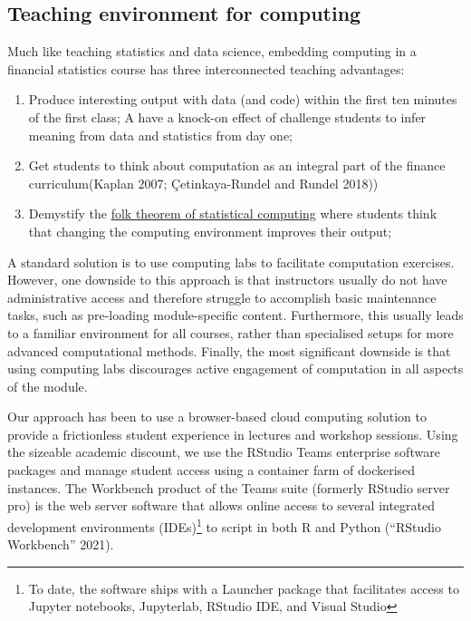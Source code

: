 \documentclass{article}
\begin{document}
\hypertarget{teaching-environment-for-computing}{%
\subsection{Teaching environment for
computing}\label{teaching-environment-for-computing}}

Much like teaching statistics and data science, embedding computing in a
financial statistics course has three interconnected teaching
advantages:

\begin{enumerate}
\def\labelenumi{\arabic{enumi}.}
\tightlist
\item
  Produce interesting output with data (and code) within the first ten
  minutes of the first class; A have a knock-on effect of challenge
  students to infer meaning from data and statistics from day one;
\item
  Get students to think about computation as an integral part of the
  finance curriculum(Kaplan 2007; Çetinkaya-Rundel and Rundel 2018))
\item
  Demystify the
  \href{https://statmodeling.stat.columbia.edu/2008/05/13/the_folk_theore/}{folk
  theorem of statistical computing} where students think that changing
  the computing environment improves their output;
\end{enumerate}

A standard solution is to use computing labs to facilitate computation
exercises. However, one downside to this approach is that instructors
usually do not have administrative access and therefore struggle to
accomplish basic maintenance tasks, such as pre-loading module-specific
content. Furthermore, this usually leads to a familiar environment for
all courses, rather than specialised setups for more advanced
computational methods. Finally, the most significant downside is that
using computing labs discourages active engagement of computation in all
aspects of the module.

Our approach has been to use a browser-based cloud computing solution to
provide a frictionless student experience in lectures and workshop
sessions. Using the sizeable academic discount, we use the RStudio Teams
enterprise software packages and manage student access using a container
farm of dockerised instances. The Workbench product of the Teams suite
(formerly RStudio server pro) is the web server software that allows
online access to several integrated development environments
(IDEs)\footnote{To date, the software ships with a Launcher package that
  facilitates access to Jupyter notebooks, Jupyterlab, RStudio IDE, and
  Visual Studio} to script in both R and Python ({``{RStudio}
Workbench''} 2021).
\end{document}
